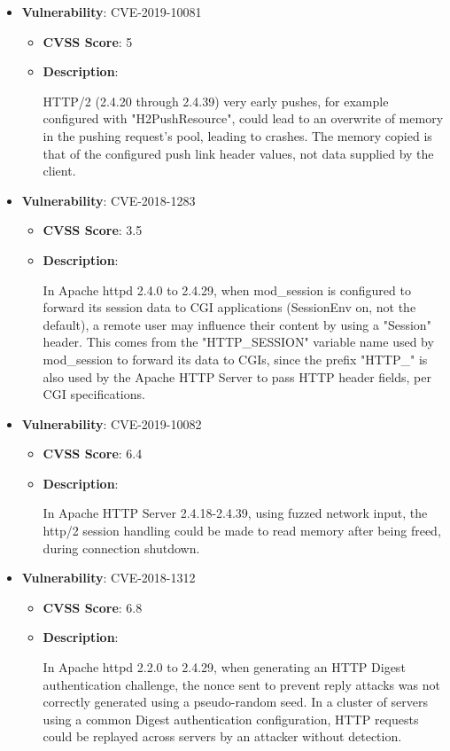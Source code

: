 \documentclass{article}
\begin{document}
\begin{itemize}
        \item \textbf{Vulnerability}: CVE-2019-10081
        \begin{itemize}
            \item \textbf{CVSS Score}:  5 
            \item \textbf{Description}:
            \parbox[t]{0.9\linewidth}{
                \ttfamily HTTP/2 (2.4.20 through 2.4.39) very early pushes, for example configured with "H2PushResource", could lead to an overwrite of memory in the pushing request's pool, leading to crashes. The memory copied is that of the configured push link header values, not data supplied by the client.
            }
        \end{itemize}
    
        \item \textbf{Vulnerability}: CVE-2018-1283
        \begin{itemize}
            \item \textbf{CVSS Score}:  3.5 
            \item \textbf{Description}:
            \parbox[t]{0.9\linewidth}{
                \ttfamily In Apache httpd 2.4.0 to 2.4.29, when mod\_session is configured to forward its session data to CGI applications (SessionEnv on, not the default), a remote user may influence their content by using a "Session" header. This comes from the "HTTP\_SESSION" variable name used by mod\_session to forward its data to CGIs, since the prefix "HTTP\_" is also used by the Apache HTTP Server to pass HTTP header fields, per CGI specifications.
            }
        \end{itemize}
    
        \item \textbf{Vulnerability}: CVE-2019-10082
        \begin{itemize}
            \item \textbf{CVSS Score}:  6.4 
            \item \textbf{Description}:
            \parbox[t]{0.9\linewidth}{
                \ttfamily In Apache HTTP Server 2.4.18-2.4.39, using fuzzed network input, the http/2 session handling could be made to read memory after being freed, during connection shutdown.
            }
        \end{itemize}
    
        \item \textbf{Vulnerability}: CVE-2018-1312
        \begin{itemize}
            \item \textbf{CVSS Score}:  6.8 
            \item \textbf{Description}:
            \parbox[t]{0.9\linewidth}{
                \ttfamily In Apache httpd 2.2.0 to 2.4.29, when generating an HTTP Digest authentication challenge, the nonce sent to prevent reply attacks was not correctly generated using a pseudo-random seed. In a cluster of servers using a common Digest authentication configuration, HTTP requests could be replayed across servers by an attacker without detection.
            }
        \end{itemize}
    

\end{itemize}
\end{document}
